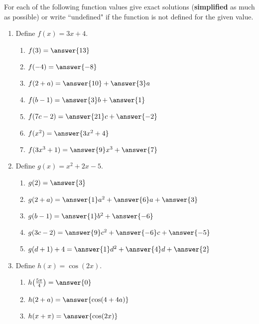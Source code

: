 \documentclass{ximera}
\author{Elizabeth Campolongo}
\begin{document}
\begin{exercise}
For each of the following function values give exact solutions ({\bf simplified} as much as possible) or write ``undefined" if the function is not defined for the given value.
%
\begin{enumerate}
%
\item Define $f(x)= 3x+4.$
\begin{enumerate}
\item $f(3) = \answer{13}$

\item $f(-4) = \answer{-8}$

\item $f(2+a)=\answer{10}+\answer{3}a$

\item $f(b-1) = \answer{3}b+\answer{1}$

\item $f(7c-2) = \answer{21}c+\answer{-2}$

\item $f(x^2) = \answer{3x^2+4}$

\item $f(3x^3+1) = \answer{9}x^3 +\answer{7}$
\end{enumerate}

\item Define $g(x)= x^2+2x-5.$
\begin{enumerate}
\item $g(2) = \answer{3}$

\item $g(2+a)=\answer{1}a^2+\answer{6}a+\answer{3}$

\item $g(b-1) = \answer{1}b^2+ \answer{-6}$

\item $g(3c-2) = \answer{9}c^2 +\answer{-6}c + \answer{-5}$

\item $g(d+1)+4 = \answer{1}d^2+\answer{4}d+\answer{2}$
\end{enumerate}


\item Define $h(x)= \cos(2x).$
\begin{enumerate}
\item $h\!\left(\frac{5\pi}{4}\right) = \answer{0}$

\item $h(2+a)=\answer{\cos(4+4a)}$

\item $h(x+\pi) = \answer{\cos(2x)}$


\end{enumerate}
\end{enumerate}
\end{exercise}
\end{document}
